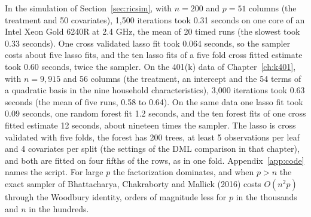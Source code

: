 In the simulation of Section~\ref{sec:ricsim}, with $n = 200$ and $p = 51$ columns (the treatment and 50 covariates), 1,500 iterations took 0.31 seconds on one core of an Intel Xeon Gold 6240R at 2.4 GHz, the mean of 20 timed runs (the slowest took 0.33 seconds). One cross validated lasso fit took 0.064 seconds, so the sampler costs about five lasso fits, and the ten lasso fits of a five fold cross fitted estimate took 0.60 seconds, twice the sampler. On the 401(k) data of Chapter~\ref{ch:k401}, with $n = 9{,}915$ and 56 columns (the treatment, an intercept and the 54 terms of a quadratic basis in the nine household characteristics), 3,000 iterations took 0.63 seconds (the mean of five runs, 0.58 to 0.64). On the same data one lasso fit took 0.09 seconds, one random forest fit 1.2 seconds, and the ten forest fits of one cross fitted estimate 12 seconds, about nineteen times the sampler. The lasso is cross validated with five folds, the forest has 200 trees, at least 5 observations per leaf and 4 covariates per split (the settings of the DML comparison in that chapter), and both are fitted on four fifths of the rows, as in one fold. Appendix~\ref{app:code} names the script. For large $p$ the factorization dominates, and when $p > n$ the exact sampler of Bhattacharya, Chakraborty and Mallick (2016) costs $O(n^2 p)$ through the Woodbury identity, orders of magnitude less for $p$ in the thousands and $n$ in the hundreds.

